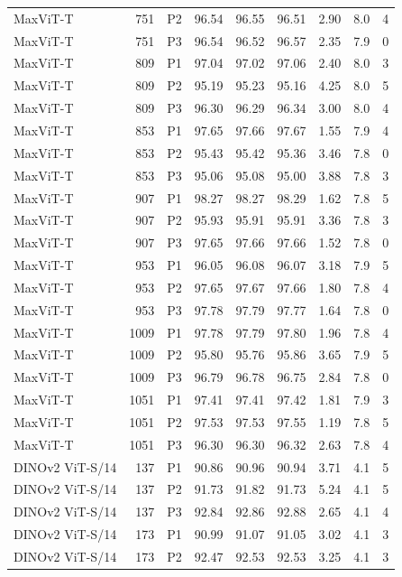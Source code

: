 {\begin{longtable}{lrlrrrrrr}
MaxViT-T & 751 & P2 & 96.54 & 96.55 & 96.51 & 2.90 & 8.0 & 4 \\
MaxViT-T & 751 & P3 & 96.54 & 96.52 & 96.57 & 2.35 & 7.9 & 0 \\
MaxViT-T & 809 & P1 & 97.04 & 97.02 & 97.06 & 2.40 & 8.0 & 3 \\
MaxViT-T & 809 & P2 & 95.19 & 95.23 & 95.16 & 4.25 & 8.0 & 5 \\
MaxViT-T & 809 & P3 & 96.30 & 96.29 & 96.34 & 3.00 & 8.0 & 4 \\
MaxViT-T & 853 & P1 & 97.65 & 97.66 & 97.67 & 1.55 & 7.9 & 4 \\
MaxViT-T & 853 & P2 & 95.43 & 95.42 & 95.36 & 3.46 & 7.8 & 0 \\
MaxViT-T & 853 & P3 & 95.06 & 95.08 & 95.00 & 3.88 & 7.8 & 3 \\
MaxViT-T & 907 & P1 & 98.27 & 98.27 & 98.29 & 1.62 & 7.8 & 5 \\
MaxViT-T & 907 & P2 & 95.93 & 95.91 & 95.91 & 3.36 & 7.8 & 3 \\
MaxViT-T & 907 & P3 & 97.65 & 97.66 & 97.66 & 1.52 & 7.8 & 0 \\
MaxViT-T & 953 & P1 & 96.05 & 96.08 & 96.07 & 3.18 & 7.9 & 5 \\
MaxViT-T & 953 & P2 & 97.65 & 97.67 & 97.66 & 1.80 & 7.8 & 4 \\
MaxViT-T & 953 & P3 & 97.78 & 97.79 & 97.77 & 1.64 & 7.8 & 0 \\
MaxViT-T & 1009 & P1 & 97.78 & 97.79 & 97.80 & 1.96 & 7.8 & 4 \\
MaxViT-T & 1009 & P2 & 95.80 & 95.76 & 95.86 & 3.65 & 7.9 & 5 \\
MaxViT-T & 1009 & P3 & 96.79 & 96.78 & 96.75 & 2.84 & 7.8 & 0 \\
MaxViT-T & 1051 & P1 & 97.41 & 97.41 & 97.42 & 1.81 & 7.9 & 3 \\
MaxViT-T & 1051 & P2 & 97.53 & 97.53 & 97.55 & 1.19 & 7.8 & 5 \\
MaxViT-T & 1051 & P3 & 96.30 & 96.30 & 96.32 & 2.63 & 7.8 & 4 \\
DINOv2 ViT-S/14 & 137 & P1 & 90.86 & 90.96 & 90.94 & 3.71 & 4.1 & 5 \\
DINOv2 ViT-S/14 & 137 & P2 & 91.73 & 91.82 & 91.73 & 5.24 & 4.1 & 5 \\
DINOv2 ViT-S/14 & 137 & P3 & 92.84 & 92.86 & 92.88 & 2.65 & 4.1 & 4 \\
DINOv2 ViT-S/14 & 173 & P1 & 90.99 & 91.07 & 91.05 & 3.02 & 4.1 & 3 \\
DINOv2 ViT-S/14 & 173 & P2 & 92.47 & 92.53 & 92.53 & 3.25 & 4.1 & 3 \\

\end{longtable}}

